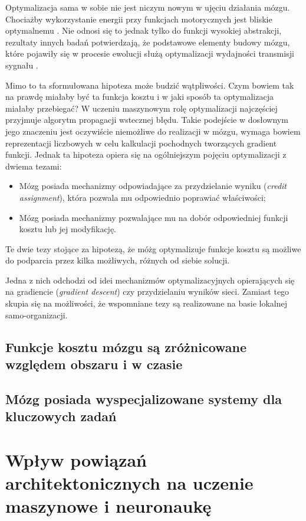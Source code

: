 Optymalizacja sama w sobie nie jest niczym nowym w ujęciu działania mózgu.
Chociażby wykorzystanie energii przy funkcjach motorycznych jest bliskie optymalnemu \cite{taylor2011does}.
Nie odnosi się to jednak tylko do funkcji wysokiej abstrakcji, rezultaty innych badań potwierdzają, że podstawowe elementy budowy mózgu, które pojawiły się w procesie ewolucji służą optymalizacji wydajności transmisji sygnału \cite{paprocki2020optimizing}.

Mimo to ta sformułowana hipoteza może budzić wątpliwości.
Czym bowiem tak na prawdę miałaby być ta funkcja kosztu i w jaki sposób ta optymalizacja miałaby przebiegać?
W uczeniu maszynowym rolę optymalizacji najczęściej przyjmuje algorytm propagacji wstecznej błędu.
Takie podejście w dosłownym jego znaczeniu jest oczywiście niemożliwe do realizacji w mózgu, wymaga bowiem reprezentacji liczbowych w celu kalkulacji pochodnych tworzących gradient funkcji.
Jednak ta hipoteza opiera się na ogólniejszym pojęciu optymalizacji z dwiema tezami:

\begin{itemize}
	\item Mózg posiada mechanizmy odpowiadające za przydzielanie wyniku (\emph{credit assignment}), która pozwala mu odpowiednio poprawiać właściwości;
	\item Mózg posiada mechanizmy pozwalające mu na dobór odpowiedniej funkcji kosztu lub jej modyfikację.
\end{itemize}

Te dwie tezy stojące za hipotezą, że móżg optymalizuje funkcje kosztu są możliwe do podparcia przez kilka możliwych, różnych od siebie solucji.

Jedna z nich odchodzi od idei mechanizmów optymalizacyjnych opierających się na gradiencie (\emph{gradient descent}) czy przydzielaniu wyników sieci.
Zamiast tego skupia się na możliwości, że wspomniane tezy są realizowane na basie lokalnej samo-organizacji.

\subsection{Funkcje kosztu mózgu są zróżnicowane względem obszaru i w czasie}

\subsection{Mózg posiada wyspecjalizowane systemy dla kluczowych zadań}

\section{Wpływ powiązań architektonicznych na uczenie maszynowe i neuronaukę}

